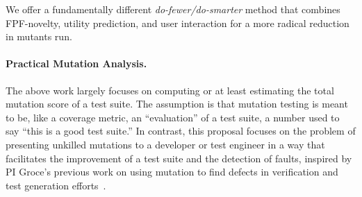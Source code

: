 We offer a fundamentally
different \emph{do-fewer/do-smarter} method that combines FPF-novelty, utility
prediction, and user interaction for a more radical reduction in
mutants run.


%

\paragraph{Practical Mutation Analysis.}
%
The above work largely focuses on computing or at least estimating the
total mutation score of a
test suite.  The assumption is that mutation testing is
meant to be, like a coverage metric, an ``evaluation'' of a
test suite, a number used to say ``this is a good test suite.''  In contrast,
this proposal focuses on the problem of presenting unkilled mutations to
a developer or test engineer in a way that facilitates the improvement
of a test suite and the detection of faults, inspired by PI Groce's
previous work on using mutation to find defects in verification
and test generation
efforts~\cite{groce2015verified,groce2018verified,mutKernel}.

